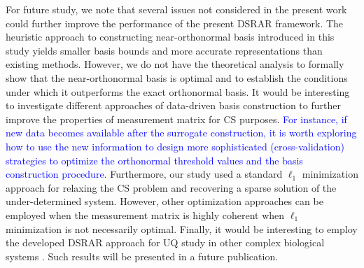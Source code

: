 For future study, we note that several issues not considered in the 
present work could further improve the performance of the present \ac{DSRAR} framework.
The heuristic approach to constructing near-orthonormal basis introduced in 
this study yields smaller basis bounds and more accurate representations than 
existing methods. However, we do not have the theoretical analysis to formally 
show that the near-orthonormal basis is optimal and to establish the conditions 
under which it outperforms the exact orthonormal basis. It would be 
interesting to investigate 
different approaches of data-driven basis construction to further improve the 
properties of measurement matrix for \ac{CS} purposes. \textcolor{blue}{For instance,
if new data becomes available after the surrogate construction, it is worth
exploring how to use the new information to design more sophisticated 
(cross-validation) strategies to optimize the orthonormal threshold 
values and the basis construction procedure.} 
Furthermore, our study used a standard $\ell_1$ minimization approach 
for relaxing the \ac{CS} 
problem and recovering a sparse solution of the under-determined system.
However, other optimization approaches can be employed when the measurement 
matrix is highly coherent when $\ell_1$ minimization is not necessarily optimal.
Finally, it would be interesting to employ the developed \ac{DSRAR} approach for
\ac{UQ} study in other complex biological systems \cite{Bajaj_ACM_2016, Bajaj_JCB_2018}.
Such results will be presented in a future publication.
